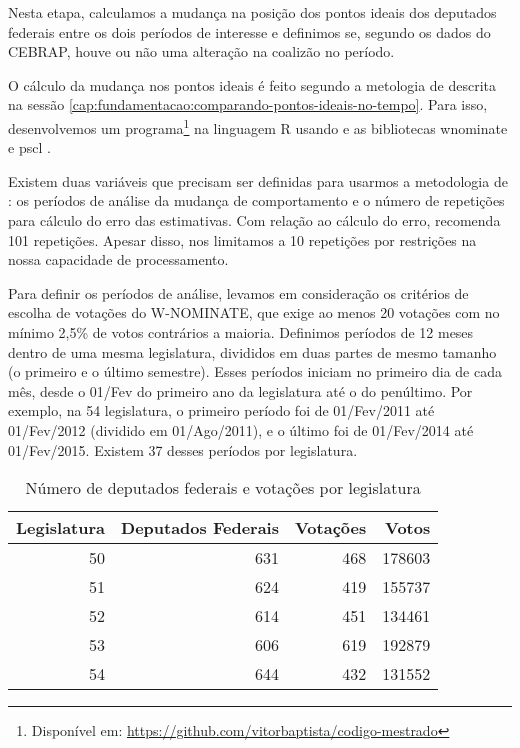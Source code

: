 \documentclass[a4paper,titlepage]{ppgi}\usepackage[]{graphicx}\usepackage[]{color}
\newenvironment{knitrout}{}{} %
\begin{document}
Nesta etapa, calculamos a mudança na posição dos pontos ideais dos deputados
federais entre os dois períodos de interesse e definimos se, segundo os dados
do \gls{CEBRAP}, houve ou não uma alteração na coalizão no período.

O cálculo da mudança nos pontos ideais é feito segundo a metologia de
 descrita na sessão
\ref{cap:fundamentacao:comparando-pontos-ideais-no-tempo}. Para isso,
desenvolvemos um programa\footnote{Disponível em:
\url{https://github.com/vitorbaptista/codigo-mestrado}} na linguagem R usando e
as bibliotecas wnominate e pscl \cite{R,R:wnominate,R:pscl}.

Existem duas variáveis que precisam ser definidas para usarmos a metodologia de
\citeauthor{Poole2005}: os períodos de análise da mudança de comportamento e o
número de repetições para cálculo do erro das estimativas. Com relação ao
cálculo do erro, \citeauthor{Poole2005} recomenda 101 repetições. Apesar disso,
nos limitamos a 10 repetições por restrições na nossa capacidade de
processamento.

Para definir os períodos de análise, levamos em consideração os critérios de
escolha de votações do W-NOMINATE, que exige ao menos 20 votações com no mínimo
2,5\% de votos contrários a maioria. Definimos períodos de 12 meses dentro de
uma mesma legislatura, divididos em duas partes de mesmo tamanho (o primeiro e
o último semestre). Esses períodos iniciam no primeiro dia de cada mês, desde o
01/Fev do primeiro ano da legislatura até o do penúltimo. Por exemplo, na
54\textordfeminine{} legislatura, o primeiro período foi de 01/Fev/2011 até
01/Fev/2012 (dividido em 01/Ago/2011), e o último foi de 01/Fev/2014 até
01/Fev/2015. Existem 37 desses períodos por legislatura.

\begin{table}
\centering
\begin{knitrout}
\color{fgcolor}
\begin{tabular}{r|r|r|r}
\hline
Legislatura & Deputados Federais & Votações & Votos\\
\hline
50 & 631 & 468 & 178603\\
\hline
51 & 624 & 419 & 155737\\
\hline
52 & 614 & 451 & 134461\\
\hline
53 & 606 & 619 & 192879\\
\hline
54 & 644 & 432 & 131552\\
\hline
\end{tabular}


\end{knitrout}
\caption{Número de deputados federais e votações por legislatura}
\label{table:estatisticas-legislaturas}
\end{table}
\end{document}
